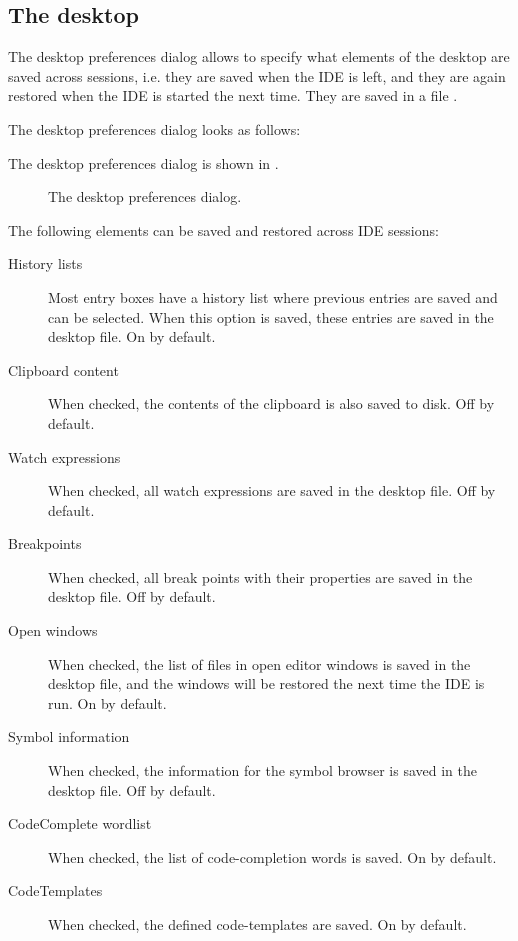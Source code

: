 \subsection{The desktop}
\label{se:prefdesktop}
The desktop preferences dialog allows to specify what elements of the
desktop are saved across sessions, i.e. they are saved when the IDE is left,
and they are again restored when the IDE is started the next time. 
They are saved in a file .

\begin{htmlonly}
The desktop preferences dialog looks as follows:
\end{htmlonly}
\begin{latexonly}
The desktop preferences dialog is shown in .
\begin{figure}[ht]
\begin{center}
\caption{The desktop preferences dialog.}\label{fig:odesktop}
\ifpdf
{}
\else
{}
\fi
\end{center}
\end{figure}
\end{latexonly}
The following elements can be saved and restored across IDE sessions:
\begin{description}
\item[History lists] Most entry boxes have a history list where previous
entries are saved and can be selected. When this option is saved, these
entries are saved in the desktop file. On by default.
\item[Clipboard content]
When checked, the contents of the clipboard is also saved to disk. Off by
default.
\item[Watch expressions]
When checked, all watch expressions are saved in the desktop file. Off by
default.
\item[Breakpoints] 
When checked, all break points with their properties are saved in the
desktop file. Off by default.
\item[Open windows]
When checked, the list of files in open editor windows is saved in the 
desktop file, and the windows will be restored the next time the IDE 
is run. On by default.
\item[Symbol information]
When checked, the information for the symbol browser is saved in the desktop
file. Off by default.
\item[CodeComplete wordlist]
When checked, the list of code-completion words is saved. On by default.
\item[CodeTemplates]
When checked, the defined code-templates are saved. On by default.
\end{description}

